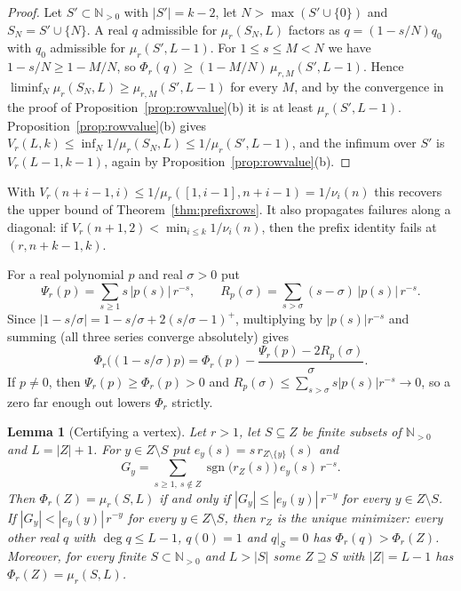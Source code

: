 \documentclass[11pt]{article}
\newtheorem{lemma}[theorem]{Lemma}
\newcommand{\N}{\mathbb N}
\DeclareMathOperator{\sgn}{sgn}
\begin{document}
\begin{proof}
Let $S'\subset\N_{>0}$ with $|S'|=k-2$, let $N>\max(S'\cup\{0\})$ and
$S_N=S'\cup\{N\}$.  A real $q$ admissible for $\mu_r(S_N,L)$ factors as
$q=(1-s/N)q_0$ with $q_0$ admissible for $\mu_r(S',L-1)$.  For
$1\le s\le M<N$ we have $1-s/N\ge1-M/N$, so
$\Phi_r(q)\ge(1-M/N)\,\mu_{r,M}(S',L-1)$.  Hence
$\liminf_N\mu_r(S_N,L)\ge\mu_{r,M}(S',L-1)$ for every $M$, and by the
convergence in the proof of Proposition~\ref{prop:rowvalue}(b) it is at
least $\mu_r(S',L-1)$.  Proposition~\ref{prop:rowvalue}(b) gives
$V_r(L,k)\le\inf_N1/\mu_r(S_N,L)\le1/\mu_r(S',L-1)$, and the infimum over
$S'$ is $V_r(L-1,k-1)$, again by Proposition~\ref{prop:rowvalue}(b).
\end{proof}

With $V_r(n+i-1,i)\le1/\mu_r([1,i-1],n+i-1)=1/\nu_i(n)$ this recovers the
upper bound of Theorem~\ref{thm:prefixrows}.  It also propagates failures
along a diagonal: if $V_r(n+1,2)<\min_{i\le k}1/\nu_i(n)$, then the prefix
identity fails at $(r,n+k-1,k)$.

For a real polynomial $p$ and real $\sigma>0$ put
\[
  \Psi_r(p)=\sum_{s\ge1}s\,|p(s)|\,r^{-s},\qquad
  R_p(\sigma)=\sum_{s>\sigma}(s-\sigma)\,|p(s)|\,r^{-s}.
\]
Since $|1-s/\sigma|=1-s/\sigma+2(s/\sigma-1)^+$, multiplying by
$|p(s)|r^{-s}$ and summing (all three series converge absolutely) gives
\[
  \Phi_r\bigl((1-s/\sigma)p\bigr)=\Phi_r(p)-\frac{\Psi_r(p)-2R_p(\sigma)}\sigma .
\]
If $p\ne0$, then $\Psi_r(p)\ge\Phi_r(p)>0$ and
$R_p(\sigma)\le\sum_{s>\sigma}s|p(s)|r^{-s}\to0$, so a zero far enough out
lowers $\Phi_r$ strictly.

\begin{lemma}[Certifying a vertex]\label{lem:vertexopt}
Let $r>1$, let $S\subseteq Z$ be finite subsets of $\N_{>0}$ and
$L=|Z|+1$.  For $y\in Z\setminus S$ put $e_y(s)=s\,r_{Z\setminus\{y\}}(s)$
and
\[
  G_y=\sum_{s\ge1,\ s\notin Z}\sgn\bigl(r_Z(s)\bigr)\,e_y(s)\,r^{-s}.
\]
Then $\Phi_r(Z)=\mu_r(S,L)$ if and only if $|G_y|\le|e_y(y)|\,r^{-y}$ for
every $y\in Z\setminus S$.  If $|G_y|<|e_y(y)|\,r^{-y}$ for every
$y\in Z\setminus S$, then $r_Z$ is the unique minimizer: every other real
$q$ with $\deg q\le L-1$, $q(0)=1$ and $q|_S=0$ has
$\Phi_r(q)>\Phi_r(Z)$.  Moreover, for every finite
$S\subset\N_{>0}$ and $L>|S|$ some $Z\supseteq S$ with $|Z|=L-1$ has
$\Phi_r(Z)=\mu_r(S,L)$.
\end{lemma}
\end{document}
